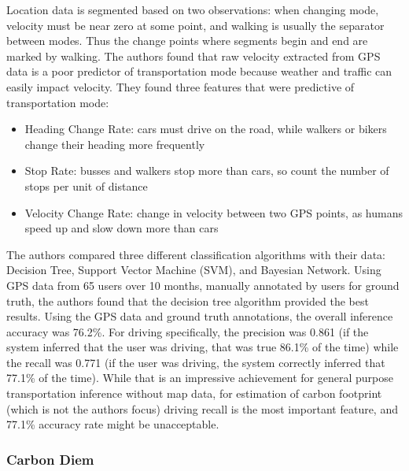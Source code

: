 Location data is segmented based on two observations: when changing mode, velocity must be near zero at some point, and walking is usually the separator between modes. Thus the change points where segments begin and end are marked by walking. The authors found that raw velocity extracted from GPS data is a poor predictor of transportation mode because weather and traffic can easily impact velocity. They found three features that were predictive of transportation mode:
\begin{itemize}
	\item Heading Change Rate: cars must drive on the road, while walkers or bikers change their heading more frequently
	\item Stop Rate: busses and walkers stop more than cars, so count the number of stops per unit of distance
	\item Velocity Change Rate: change in velocity between two GPS points, as humans speed up and slow down more than cars
\end{itemize}

The authors compared three different classification algorithms with their data: 
Decision Tree, Support Vector Machine (SVM), and Bayesian Network. Using GPS data from 65 users over 10 months, manually annotated by users for ground truth, the authors found that the decision tree algorithm provided the best results. Using the GPS data and ground truth annotations, the overall inference accuracy was 76.2\%. For driving specifically, the precision was 0.861 (if the system inferred that the user was driving, that was true 86.1\% of the time) while the recall was 0.771 (if the user was driving, the system correctly inferred that 77.1\% of the time). While that is an impressive achievement for general purpose transportation inference without map data, for estimation of carbon footprint (which is not the authors focus) driving recall is the most important feature, and 77.1\% accuracy rate might be unacceptable.

\subsubsection{Carbon Diem}

